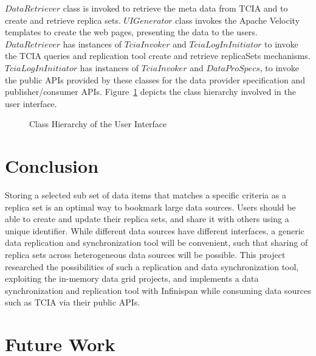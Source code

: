 \documentclass[conference]{IEEEtran}
\begin{document}
$DataRetriever$ class is invoked to retrieve the meta data from TCIA and to create and retrieve replica sets. $UIGenerator$ class invokes the Apache Velocity templates to create the web pages, presenting the data to the users. $DataRetriever$ has instances of $TciaInvoker$ and $TciaLogInInitiator$ to invoke the TCIA queries and replication tool create and retrieve replicaSets mechanisms. $TciaLogInInitiator$ has instances of $TciaInvoker$ and $DataProSpecs$, to invoke the public APIs provided by these classes for the data provider specification and publisher/consumer APIs. Figure~\ref{fig:classUX} depicts the class hierarchy involved in the user interface.
\begin{figure}[!htbp]
\begin{center}
\end{center}
 \caption{Class Hierarchy of the User Interface}
 \label{fig:classUX}
\end{figure}

\section{Conclusion}
\balance
Storing a selected sub set of data items that matches a specific criteria as a replica set is an optimal way to bookmark large data sources. Users should be able to create and update their replica sets, and share it with others using a unique identifier. While different data sources have different interfaces, a generic data replication and synchronization tool will be convenient, such that sharing of replica sets across heterogeneous data sources will be possible. This project researched the possibilities of such a replication and data synchronization tool, exploiting the in-memory data grid projects, and implements a data synchronization and replication tool with Infinispan while consuming data sources such as TCIA via their public APIs.

\section{Future Work}
\end{document}
